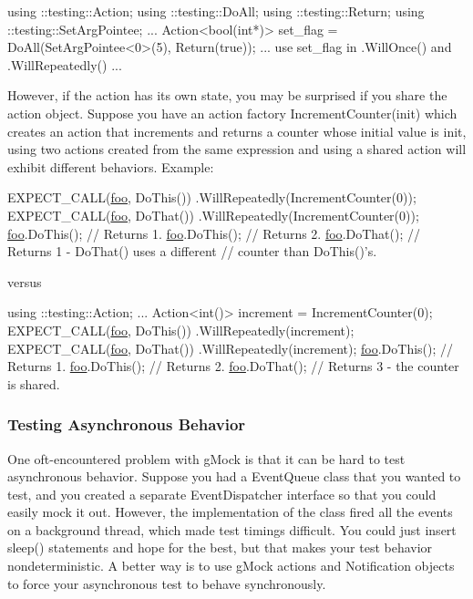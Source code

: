 \begin{DoxyCode}
using ::testing::Action;
using ::testing::DoAll;
using ::testing::Return;
using ::testing::SetArgPointee;
...
  Action<bool(int*)> set\_flag = DoAll(SetArgPointee<0>(5),
                                      Return(\textcolor{keyword}{true}));
  ... use set\_flag in .WillOnce() and .WillRepeatedly() ...
\end{DoxyCode}


However, if the action has its own state, you may be surprised if you share the action object. Suppose you have an action factory {\ttfamily Increment\+Counter(init)} which creates an action that increments and returns a counter whose initial value is {\ttfamily init}, using two actions created from the same expression and using a shared action will exhibit different behaviors. Example\+:


\begin{DoxyCode}
EXPECT\_CALL(\mbox{\hyperlink{namespacefoo}{foo}}, DoThis())
    .WillRepeatedly(IncrementCounter(0));
EXPECT\_CALL(\mbox{\hyperlink{namespacefoo}{foo}}, DoThat())
    .WillRepeatedly(IncrementCounter(0));
\mbox{\hyperlink{namespacefoo}{foo}}.DoThis();  \textcolor{comment}{// Returns 1.}
\mbox{\hyperlink{namespacefoo}{foo}}.DoThis();  \textcolor{comment}{// Returns 2.}
\mbox{\hyperlink{namespacefoo}{foo}}.DoThat();  \textcolor{comment}{// Returns 1 - DoThat() uses a different}
               \textcolor{comment}{// counter than DoThis()'s.}
\end{DoxyCode}


versus


\begin{DoxyCode}
using ::testing::Action;
...
  Action<int()> increment = IncrementCounter(0);
  EXPECT\_CALL(\mbox{\hyperlink{namespacefoo}{foo}}, DoThis())
      .WillRepeatedly(increment);
  EXPECT\_CALL(\mbox{\hyperlink{namespacefoo}{foo}}, DoThat())
      .WillRepeatedly(increment);
  \mbox{\hyperlink{namespacefoo}{foo}}.DoThis();  \textcolor{comment}{// Returns 1.}
  \mbox{\hyperlink{namespacefoo}{foo}}.DoThis();  \textcolor{comment}{// Returns 2.}
  \mbox{\hyperlink{namespacefoo}{foo}}.DoThat();  \textcolor{comment}{// Returns 3 - the counter is shared.}
\end{DoxyCode}


\subsubsection*{Testing Asynchronous Behavior}

One oft-\/encountered problem with g\+Mock is that it can be hard to test asynchronous behavior. Suppose you had a {\ttfamily Event\+Queue} class that you wanted to test, and you created a separate {\ttfamily Event\+Dispatcher} interface so that you could easily mock it out. However, the implementation of the class fired all the events on a background thread, which made test timings difficult. You could just insert {\ttfamily sleep()} statements and hope for the best, but that makes your test behavior nondeterministic. A better way is to use g\+Mock actions and {\ttfamily Notification} objects to force your asynchronous test to behave synchronously.


